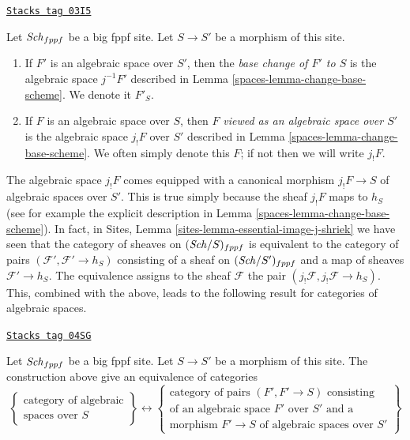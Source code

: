 \begin{definition}
\label{spaces-definition-base-change}
\href{https://stacks.math.columbia.edu/tag/03I5}{\texttt{Stacks tag 03I5}}

Let $\mathit{Sch}_{fppf}$ be a big fppf site.
Let $S \to S'$ be a morphism of this site.
\begin{enumerate}
\item If $F'$ is an algebraic space over $S'$, then the
{\it base change of $F'$ to $S$} is the
algebraic space $j^{-1}F'$ described in
Lemma \ref{spaces-lemma-change-base-scheme}. We denote it $F'_S$.
\item If $F$ is an algebraic space over $S$, then $F$
{\it viewed as an algebraic space over $S'$}
is the algebraic space $j_!F$ over $S'$ described in
Lemma \ref{spaces-lemma-change-base-scheme}. We often simply denote this
$F$; if not then we will write $j_!F$.
\end{enumerate}
\end{definition}

The algebraic space $j_!F$ comes equipped with a canonical morphism
$j_!F \to S$ of algebraic spaces over $S'$. This is true simply
because the sheaf $j_!F$ maps to $h_S$ (see for example the
explicit description in
Lemma \ref{spaces-lemma-change-base-scheme}).
In fact, in
Sites, Lemma \ref{sites-lemma-essential-image-j-shriek}
we have seen that the category of sheaves on $(\mathit{Sch}/S)_{fppf}$
is equivalent to the category of pairs $(\mathcal{F}', \mathcal{F}' \to h_S)$
consisting of a sheaf on $(\mathit{Sch}/S')_{fppf}$ and a map of sheaves
$\mathcal{F}' \to h_S$. The equivalence assigns to the sheaf $\mathcal{F}$
the pair $(j_!\mathcal{F}, j_!\mathcal{F} \to h_S)$.
This, combined with the above, leads to the following
result for categories of algebraic spaces.

\begin{lemma}
\label{spaces-lemma-category-of-spaces-over-smaller-base-scheme}
\href{https://stacks.math.columbia.edu/tag/04SG}{\texttt{Stacks tag 04SG}}

Let $\mathit{Sch}_{fppf}$ be a big fppf site.
Let $S \to S'$ be a morphism of this site.
The construction above give an equivalence of
categories
$$
\left\{
\begin{matrix}
\text{category of algebraic}\\
\text{spaces over }S
\end{matrix}
\right\}
\leftrightarrow
\left\{
\begin{matrix}
\text{category of pairs }(F', F' \to S)\text{ consisting}\\
\text{of an algebraic space }F'\text{ over }S'\text{ and a}\\
\text{morphism }F' \to S\text{ of algebraic spaces over }S'
\end{matrix}
\right\}
$$
\end{lemma}

